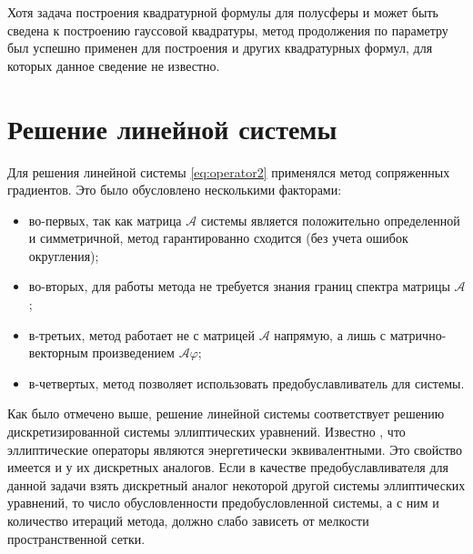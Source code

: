 Хотя задача построения квадратурной формулы для полусферы и может быть сведена к построению гауссовой квадратуры, метод продолжения по параметру был успешно применен для построения и других квадратурных формул, для которых данное сведение не известно.


\section{Решение линейной системы}

Для решения линейной системы \eqref{eq:operator2} применялся метод сопряженных градиентов. Это было обусловлено несколькими факторами:
\begin{itemize}
\item во-первых, так как матрица  $\mathcal A$ системы является положительно определенной и симметричной, метод гарантированно сходится (без учета ошибок округления);
\item во-вторых, для работы метода не требуется знания границ спектра матрицы  $\mathcal A$;
\item в-третьих, метод работает не с матрицей $\mathcal A$ напрямую, а лишь с матрично-векторным произведением  $\mathcal{A} \varphi$;
\item в-четвертых, метод позволяет использовать предобуславливатель для системы.
\end{itemize}

Как было отмечено выше, решение линейной системы соответствует решению дискретизированной системы эллиптических уравнений. Известно \cite{samarskiy}, что эллиптические операторы являются энергетически эквивалентными. Это свойство имеется и у их дискретных аналогов. Если в качестве предобуславливателя для данной задачи взять дискретный аналог некоторой другой системы эллиптических уравнений, то число обусловленности предобусловленной системы, а с ним и количество итераций метода, должно слабо зависеть от мелкости пространственной сетки.

